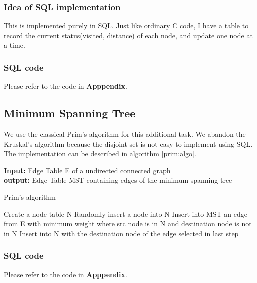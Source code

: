 \subsubsection{Idea of SQL implementation}
This is implemented purely in SQL. Just like ordinary C code, I have a table to record the current status(visited, distance) of each node, and update one node at a time. 

\subsubsection{SQL code}
Please refer to the code in {\bf Apppendix}.

\subsection{Minimum Spanning Tree}
We use the classical Prim's algorithm for this additional task. We abandon the Kruskal's algorithm because the disjoint set is not easy to implement using SQL. The implementation can be described in algorithm \ref{prim:algo}.

\begin{algorithm}
{\bf Input:} Edge Table E of a undirected connected graph \\
{\bf output:} Edge Table MST containing edges of the minimum spanning tree
\begin{algorithmic}
\caption{Prim's algorithm}
\STATE Create a node table N
\STATE Randomly insert a node into N
	\STATE Insert into MST an edge from E with minimum weight where src node is in N and destination node is not in N
	\STATE Insert into N with the destination node of the edge selected in last step
\ENDFOR
\end{algorithmic}
\label{prim:algo}
\end{algorithm}

\subsubsection{SQL code}
Please refer to the code in {\bf Apppendix}.



